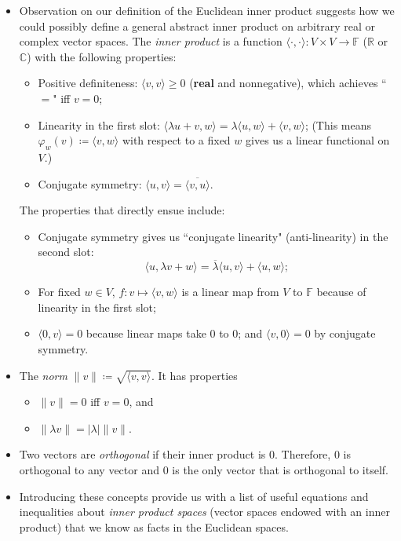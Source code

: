 \documentclass{article}
\newcommand{\R}{\mathbb{R}}
\newcommand{\C}{\mathbb{C}}
\newcommand{\F}{\mathbb{F}}
\newcommand{\conj}[1]{\overline{#1}}
\newcommand{\inp}[2]{\langle #1, #2 \rangle}
\renewcommand{\phi}{\varphi}
\begin{document}
\begin{itemize}
    \item Observation on our definition of the Euclidean inner product suggests how we could possibly define a general abstract inner product on arbitrary real or complex vector spaces. The \textit{inner product} is a function $\inp{\cdot}{\cdot}: V \times V \to \F$ ($\R$ or $\C$) with the following properties:
    \begin{itemize}
        \item Positive definiteness: $\inp{v}{v} \geq 0$ (\textbf{real} and nonnegative), which achieves ``$=$" iff $v = 0$;
        \item Linearity in the first slot: $\inp{\lambda u+v}{w} = \lambda \inp{u}{w} + \inp{v}{w}$; (This means $\phi_w(v) \coloneqq \inp{v}{w}$ with respect to a fixed $w$ gives us a linear functional on $V$.)
        \item Conjugate symmetry: $\inp{u}{v} = \conj{\inp{v}{u}}$.
    \end{itemize}
    The properties that directly ensue include:
    \begin{itemize}
        \item Conjugate symmetry gives us ``conjugate linearity" (anti-linearity) in the second slot: $$\inp{u}{\lambda v+w} = \conj{\lambda} \inp{u}{v} + \inp{u}{w};$$
        \item For fixed $w \in V$, $f: v \mapsto \inp{v}{w}$ is a linear map from $V$ to $\F$ because of linearity in the first slot;
        \item $\inp{0}{v} = 0$ because linear maps take 0 to 0; and $\inp{v}{0} = 0$ by conjugate symmetry.
    \end{itemize}
    \item The \textit{norm} $\|v\| \coloneqq \sqrt{\inp{v}{v}}.$ It has properties
    \begin{itemize}
        \item $\|v\| = 0$ iff $v = 0$, and 
        \item $\|\lambda v\| = |\lambda| \|v\|$.
    \end{itemize}
    \item Two vectors are \textit{orthogonal} if their inner product is 0. Therefore, 0 is orthogonal to any vector and 0 is the only vector that is orthogonal to itself.
    \item Introducing these concepts provide us with a list of useful equations and inequalities about \textit{inner product spaces} (vector spaces endowed with an inner product) that we know as facts in the Euclidean spaces.
    \begin{itemize}

\end{itemize}
\end{itemize}
\end{document}
